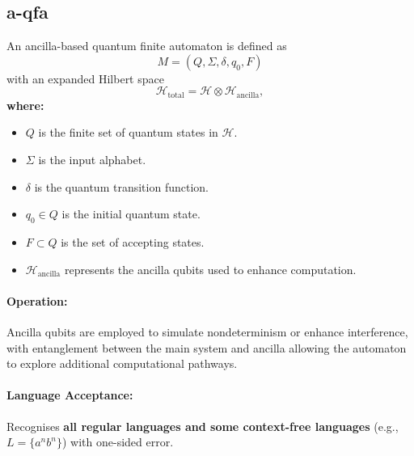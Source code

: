 





\subsection{\acrfull{a-qfa}}
\label{subsec:a-qfa}
\begin{definition}
An ancilla-based quantum finite automaton is defined as 
\[
M = (Q, \Sigma, \delta, q_0, F)
\]
with an expanded Hilbert space 
\[
\mathcal{H}_{\text{total}} = \mathcal{H} \otimes \mathcal{H}_{\text{ancilla}},
\]
\textbf{where:}
\begin{itemize}
    \item \( Q \) is the finite set of quantum states in \( \mathcal{H} \).
    \item \( \Sigma \) is the input alphabet.
    \item \( \delta \) is the quantum transition function.
    \item \( q_0 \in Q \) is the initial quantum state.
    \item \( F \subset Q \) is the set of accepting states.
    \item \( \mathcal{H}_{\text{ancilla}} \) represents the ancilla qubits used to enhance computation.
\end{itemize}
\end{definition}

\paragraph{Operation:}  
Ancilla qubits are employed to simulate nondeterminism or enhance interference, with entanglement between the main system and ancilla allowing the automaton to explore additional computational pathways.

\paragraph{Language Acceptance:}  
Recognises \textbf{all regular languages and some context-free languages} (e.g., \( L = \{a^n b^n\} \)) with one-sided error.

